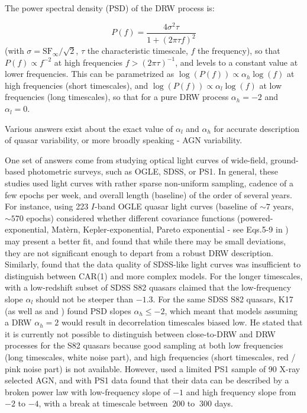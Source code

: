 \documentclass[twocolumn]{aastex62}
\begin{document}
The power spectral density (PSD) of the DRW process is:

\begin{equation}
P(f) = \frac{4\sigma^{2}\tau}{1+(2 \pi \tau f)^{2}}
\end{equation}
(with $\sigma = \mathrm{SF}_{\infty} / \sqrt{2}$, $\tau$ the characteristic timescale, $f$ the frequency), so that $P(f) \propto f^{-2}$  at high frequencies $f > (2\pi \tau)^{-1}$, and levels to a constant value at lower frequencies\citep{kelly2014}. This can be parametrized as $\log{(P(f))} \propto \alpha_h \log{(f)}$ at high frequencies (short timescales), and  $\log{(P(f))} \propto \alpha_l \log{(f)}$  at low frequencies (long timescales), so that for a pure DRW process $\alpha_{h}=-2$ and $\alpha_{l} = 0$.  

Various answers exist about the exact value of  $\alpha_{l}$ and $\alpha_{h}$ for accurate description of quasar variability,  or more broadly speaking -  AGN variability. 

One set of answers come from studying optical light curves of wide-field, ground-based photometric surveys, such as OGLE, SDSS, or PS1. In general, these studies used  light curves with rather sparse non-uniform sampling, cadence of a few epochs per week,  and overall length (baseline) of the order of several years.  
For instance, \citet{zu2013}  using 223 $I$-band  OGLE quasar  light curves (baseline of  ${\sim}7$ years, ${\sim}570$ epochs) considered whether different covariance functions (powered-exponential, Mat\`ern, Kepler-exponential, Pareto exponential - see Eqs.5-9 in \citealt{zu2013}) may present a better fit, and found that while there may be small deviations, they are not significant enough to depart from a robust DRW description.  Similarly, \citet{sun2018} found that the data quality of SDSS-like light curves was insufficient to distinguish between CAR(1) and more complex models.   For the longer timescales, \cite{guo2017} with a low-redshift subset of SDSS S82 quasars  claimed  that the low-frequency slope  $\alpha_{l}$ should not be steeper than $-1.3$. For the same SDSS S82 quasars,  K17 (as well as \citealt{kozlowski2016b} and \citealt{caplar2017}) found PSD slopes $\alpha_{h} \leqslant -2$, which meant that models assuming a DRW $\alpha_{h}=2$ would result in decorrelation timescales biased low. He stated that it is currently not possible to distinguish between close-to-DRW and DRW processes for the S82 quasars because good sampling at both low frequencies (long timescales, white noise part), and high frequencies (short timescales, red / pink noise part) is not available. However, \cite{simm2016} used a limited PS1 sample of 90 X-ray selected AGN, and with PS1 data found that their data can be described by a broken power law with low-frequency slope  of $-1$ and high frequency slope from $-2$ to $-4$, with a break at timescale between $~200$ to $~300$ days.   
\end{document}
